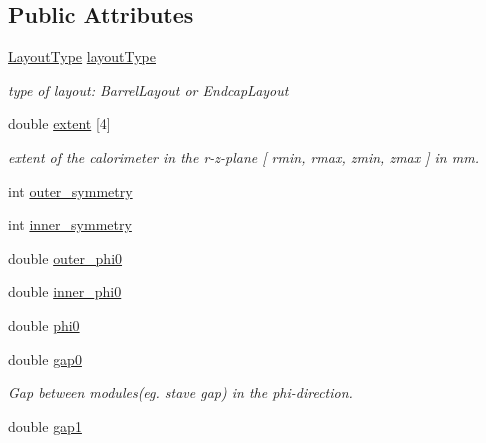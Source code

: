 \subsection*{Public Attributes}
\begin{DoxyCompactItemize}
\item 
\hyperlink{struct_d_d4hep_1_1_d_d_rec_1_1_layered_calorimeter_struct_a560e60d5a6a1671ab8b21629714b4d36}{Layout\+Type} \hyperlink{struct_d_d4hep_1_1_d_d_rec_1_1_layered_calorimeter_struct_a141e4dca7fb6f24249a79912e18e964d}{layout\+Type}
\begin{DoxyCompactList}\small\item\em type of layout\+: Barrel\+Layout or Endcap\+Layout \end{DoxyCompactList}\item 
double \hyperlink{struct_d_d4hep_1_1_d_d_rec_1_1_layered_calorimeter_struct_ae15cea59aab1ff3db73f1e981d13c6cc}{extent} \mbox{[}4\mbox{]}
\begin{DoxyCompactList}\small\item\em extent of the calorimeter in the r-\/z-\/plane \mbox{[} rmin, rmax, zmin, zmax \mbox{]} in mm. \end{DoxyCompactList}\item 
int \hyperlink{struct_d_d4hep_1_1_d_d_rec_1_1_layered_calorimeter_struct_a6adea28c87118351ef0854a54ed106b5}{outer\+\_\+symmetry}
\item 
int \hyperlink{struct_d_d4hep_1_1_d_d_rec_1_1_layered_calorimeter_struct_a94ead288a528b23775bde06ccfd00e99}{inner\+\_\+symmetry}
\item 
double \hyperlink{struct_d_d4hep_1_1_d_d_rec_1_1_layered_calorimeter_struct_a4fa8650165dff7097401fa4a6de40f89}{outer\+\_\+phi0}
\item 
double \hyperlink{struct_d_d4hep_1_1_d_d_rec_1_1_layered_calorimeter_struct_a5ea761ee743ac216f442d91f97d82516}{inner\+\_\+phi0}
\item 
double \hyperlink{struct_d_d4hep_1_1_d_d_rec_1_1_layered_calorimeter_struct_a1c5124161001b81077ce44414cfe046d}{phi0}
\item 
double \hyperlink{struct_d_d4hep_1_1_d_d_rec_1_1_layered_calorimeter_struct_aab4f81fe9fc897a94eadbd59ff308bdb}{gap0}
\begin{DoxyCompactList}\small\item\em Gap between modules(eg. stave gap) in the phi-\/direction. \end{DoxyCompactList}\item 
double \hyperlink{struct_d_d4hep_1_1_d_d_rec_1_1_layered_calorimeter_struct_a0b341d9a31ccf086d69dc2602eed2eec}{gap1}

\end{DoxyCompactItemize}
